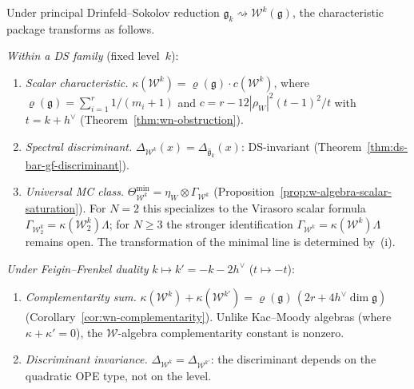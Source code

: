 \begin{proposition}
\label{prop:ds-package-functoriality}
Under principal Drinfeld--Sokolov reduction
$\widehat{\mathfrak{g}}_k \rightsquigarrow
\mathcal{W}^k(\mathfrak{g})$, the characteristic package
transforms as follows.

\smallskip\noindent
\emph{Within a DS family} (fixed level~$k$):
\begin{enumerate}[label=\textup{(\roman*)}]
\item \emph{Scalar characteristic.}
  $\kappa(\mathcal{W}^k) = \varrho(\mathfrak{g}) \cdot c(\mathcal{W}^k)$,
  where $\varrho(\mathfrak{g}) = \sum_{i=1}^{r} 1/(m_i + 1)$
  and $c = r - 12|\rho_W|^2(t-1)^2/t$ with $t = k + h^\vee$
  \textup{(}Theorem~\textup{\ref{thm:wn-obstruction}}\textup{)}.
\item \emph{Spectral discriminant.}
  $\Delta_{\mathcal{W}^k}(x)$\allowbreak${} = \Delta_{\widehat{\mathfrak{g}}_k}(x)$:
  DS-invariant
  \textup{(}Theorem~\textup{\ref{thm:ds-bar-gf-discriminant}}\textup{)}.
\item \emph{Universal MC class.}
  $\Theta_{\mathcal{W}^k}^{\min}
  = \eta_W \otimes \Gamma_{\mathcal{W}^k}$
  \textup{(}Proposition~\textup{\ref{prop:w-algebra-scalar-saturation}}\textup{)}.
  For $N=2$ this specializes to the Virasoro scalar formula
  $\Gamma_{\mathcal{W}_2^k}
  = \kappa(\mathcal{W}_2^k)\Lambda$; for $N \ge 3$ the
  stronger identification
  $\Gamma_{\mathcal{W}^k}
  = \kappa(\mathcal{W}^k)\Lambda$ remains open.
  The transformation of the minimal line is determined
  by~\textup{(i)}.
\end{enumerate}

\smallskip\noindent
\emph{Under Feigin--Frenkel duality}
$k \mapsto k' = -k - 2h^\vee$ ($t \mapsto -t$):
\begin{enumerate}[label=\textup{(\roman*)},start=4]
\item \emph{Complementarity sum.}
  $\kappa(\mathcal{W}^k) + \kappa(\mathcal{W}^{k'})
  = \varrho(\mathfrak{g})\,(2r + 4h^\vee\dim\mathfrak{g})$
  \textup{(}Corollary~\textup{\ref{cor:wn-complementarity}}\textup{)}.
  Unlike Kac--Moody algebras (where $\kappa + \kappa' = 0$),
  the $\mathcal{W}$-algebra complementarity constant is nonzero.
\item \emph{Discriminant invariance.}
  $\Delta_{\mathcal{W}^k} = \Delta_{\mathcal{W}^{k'}}$:
  the discriminant depends on the quadratic OPE type, not
  on the level.
\end{enumerate}
\end{proposition}

